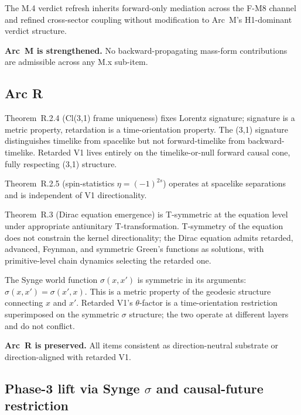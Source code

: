 \documentclass[11pt,a4paper]{article}
\begin{document}
The M.4 verdict refresh inherits forward-only mediation across the F-M8 channel and refined cross-sector coupling without modification to Arc~M's H1-dominant verdict structure.

\textbf{Arc~M is strengthened.} No backward-propagating mass-form contributions are admissible across any M.x sub-item.

\subsection{Arc R}

Theorem~R.2.4 (Cl(3,1) frame uniqueness) fixes Lorentz signature; signature is a metric property, retardation is a time-orientation property. The (3,1) signature distinguishes timelike from spacelike but not forward-timelike from backward-timelike. Retarded V1 lives entirely on the timelike-or-null forward causal cone, fully respecting (3,1) structure.

Theorem~R.2.5 (spin-statistics $\eta = (-1)^{2s}$) operates at spacelike separations and is independent of V1 directionality.

Theorem~R.3 (Dirac equation emergence) is T-symmetric at the equation level under appropriate antiunitary T-transformation. T-symmetry of the equation does not constrain the kernel directionality; the Dirac equation admits retarded, advanced, Feynman, and symmetric Green's functions as solutions, with primitive-level chain dynamics selecting the retarded one.

The Synge world function $\sigma(x, x')$ is symmetric in its arguments: $\sigma(x, x') = \sigma(x', x)$. This is a metric property of the geodesic structure connecting $x$ and $x'$. Retarded V1's $\theta$-factor is a time-orientation restriction superimposed on the symmetric $\sigma$ structure; the two operate at different layers and do not conflict.

\textbf{Arc~R is preserved.} All items consistent as direction-neutral substrate or direction-aligned with retarded V1.

\subsection{Phase-3 lift via Synge $\sigma$ and causal-future restriction}
\end{document}
